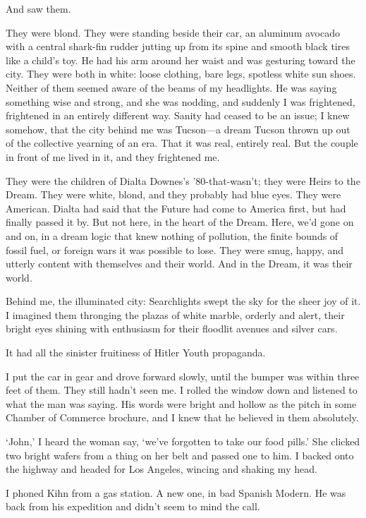 And saw them.

They were blond. They were standing beside their car, an aluminum avocado with a central shark-fin rudder jutting up from its spine and smooth black tires like a child's toy. He had his arm around her waist and was gesturing toward the city. They were both in white: loose clothing, bare legs, spotless white sun shoes. Neither of them seemed aware of the beams of my headlights. He was saying something wise and strong, and she was nodding, and suddenly I was frightened, frightened in an entirely different way. Sanity had ceased to be an issue; I knew somehow, that the city behind me was Tucson—a dream Tucson thrown up out of the collective yearning of an era. That it was real, entirely real. But the couple in front of me lived in it, and they frightened me.

They were the children of Dialta Downes's '80-that-wasn't; they were Heirs to the Dream. They were white, blond, and they probably had blue eyes. They were American. Dialta had said that the Future had come to America first, but had finally passed it by. But not here, in the heart of the Dream. Here, we'd gone on and on, in a dream logic that knew nothing of pollution, the finite bounds of fossil fuel, or foreign wars it was possible to lose. They were smug, happy, and utterly content with themselves and their world. And in the Dream, it was their world.

Behind me, the illuminated city: Searchlights swept the sky for the sheer joy of it. I imagined them thronging the plazas of white marble, orderly and alert, their bright eyes shining with enthusiasm for their floodlit avenues and silver cars.

It had all the sinister fruitiness of Hitler Youth propaganda.

I put the car in gear and drove forward slowly, until the bumper was within three feet of them. They still hadn't seen me. I rolled the window down and listened to what the man was saying. His words were bright and hollow as the pitch in some Chamber of Commerce brochure, and I knew that he believed in them absolutely.

`John,' I heard the woman say, `we've forgotten to take our food pills.' She clicked two bright wafers from a thing on her belt and passed one to him. I backed onto the highway and headed for Los Angeles, wincing and shaking my head.

I phoned Kihn from a gas station. A new one, in bad Spanish Modern. He was back from his expedition and didn't seem to mind the call.

